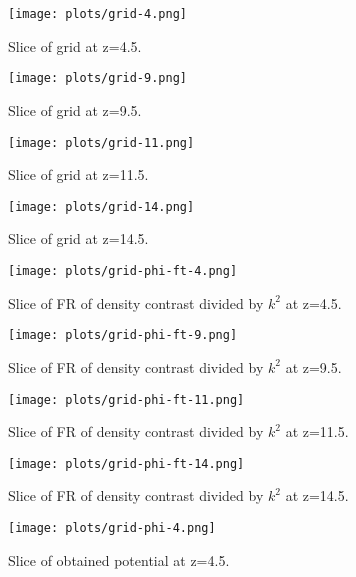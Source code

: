 \documentclass{article}
\begin{document}


\begin{figure}
    \centering
    \texttt{[image: plots/grid-4.png]}
    \caption{Slice of grid at z=4.5.}
    \label{fig:my_label}
\end{figure}

\begin{figure}
    \centering
    \texttt{[image: plots/grid-9.png]}
    \caption{Slice of grid at z=9.5.}
    \label{fig:my_label}
\end{figure}

\begin{figure}
    \centering
    \texttt{[image: plots/grid-11.png]}
    \caption{Slice of grid at z=11.5.}
    \label{fig:my_label}
\end{figure}

\begin{figure}
    \centering
    \texttt{[image: plots/grid-14.png]}
    \caption{Slice of grid at z=14.5.}
    \label{fig:my_label}
\end{figure}

\begin{figure}
    \centering
    \texttt{[image: plots/grid-phi-ft-4.png]}
    \caption{Slice of FR of density contrast divided by $k^2$ at z=4.5.}
    \label{fig:my_label}
\end{figure}

\begin{figure}
    \centering
    \texttt{[image: plots/grid-phi-ft-9.png]}
    \caption{Slice of FR of density contrast divided by $k^2$ at z=9.5.}
    \label{fig:my_label}
\end{figure}

\begin{figure}
    \centering
    \texttt{[image: plots/grid-phi-ft-11.png]}
    \caption{Slice of FR of density contrast divided by $k^2$ at z=11.5.}
    \label{fig:my_label}
\end{figure}

\begin{figure}
    \centering
    \texttt{[image: plots/grid-phi-ft-14.png]}
    \caption{Slice of FR of density contrast divided by $k^2$ at z=14.5.}
    \label{fig:my_label}
\end{figure}

\begin{figure}
    \centering
    \texttt{[image: plots/grid-phi-4.png]}
    \caption{Slice of obtained potential at z=4.5.}
    \label{fig:my_label}
\end{figure}
\end{document}
